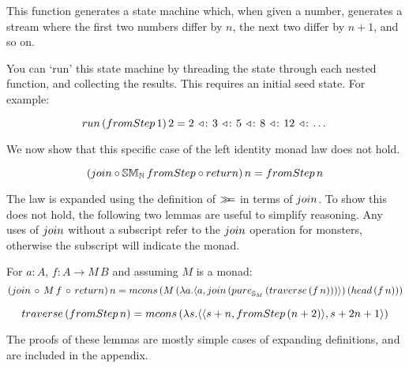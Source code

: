 This function generates a state machine which, when given a number, generates a stream where the first two numbers differ by $n$, the next two differ by $n + 1$, and so on.

You can `run' this state machine by threading the state through each nested function, and collecting the results. This requires an initial seed state. For example:

$$
\strun\,(\fromstepstr\, 1)\, 2 = 2\, \acons\, 3\, \acons\, 5\, \acons\, 8\, \acons\, 12\, \acons\, \dots
$$

We now show that this specific case of the left identity monad law does not hold. 

$$
(\join \comp \stmon{\nat}\, \fromstepstr \comp \return)\, n = \fromstepstr\, n
$$



The law is expanded using the definition of $\mathbin{\gg\!\!=}$ in terms of $\join$. 
To show this does not hold, the following two lemmas are useful to simplify reasoning. Any uses of $\join$ without a subscript refer to the $\join$ operation for monsters, otherwise the subscript will indicate the monad.

\begin{lemma}\label{lemma:general_bind_law}
For $a : A$, $f : A \rightarrow M\, B$ and assuming $M$ is a monad:
$$
(\join\, \comp\,  M\, f\, \comp\, \return)\, n = \mcons\, (M\,(\lambda a . \pair{a}{\join\, (\apure_{\stream{M}}\, (\mathsf{traverse}\, (f\, n)))})\, (\head\, (f\, n)))
$$
\end{lemma}
\begin{lemma}\label{lemma:traverse_fromstepstr}
$$
\mathsf{traverse}\, (\fromstepstr\, n) = \mcons\, (\lambda s . \pair{\pair{s+n}{\fromstepstr\, (n + 2)}}{s + 2n + 1})
$$
\end{lemma} 

The proofs of these lemmas are mostly simple cases of expanding definitions, and are included in the appendix.

